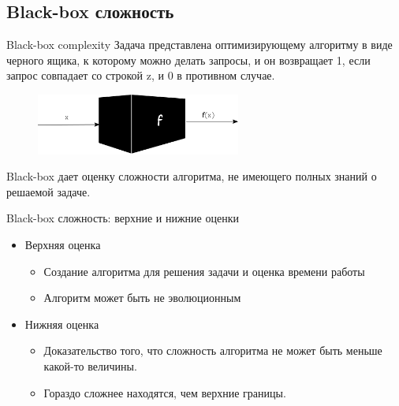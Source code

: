 \documentclass{beamer}
\begin{document}


 \subsection{Black-box сложность}
 
 \begin{frame}{Black-box complexity}
    Задача представлена оптимизирующему алгоритму в виде черного ящика, к которому можно делать запросы, и он возвращает 1, если запрос совпадает со строкой z, и 0 в противном случае.
    \begin{figure}[h]
    \includegraphics[height=2cm]{blackbox.png}
    \end{figure}
    Black-box дает оценку сложности алгоритма, не имеющего полных знаний о решаемой задаче.   
 \end{frame}
 
 
  \begin{frame}{Black-box сложность: верхние и нижние оценки}
  \begin{itemize}
   \item Верхняя оценка
        \begin{itemize}
            \item Создание алгоритма для решения задачи и оценка  времени работы
            \item Алгоритм может быть не эволюционным
        \end{itemize}
    \item Нижняя оценка
        \begin{itemize}
            \item Доказательство того, что сложность алгоритма не может быть меньше какой-то величины.
            \item Гораздо сложнее находятся, чем верхние границы.
        \end{itemize}
    \end{itemize}
 \end{frame}

 
\end{document}
